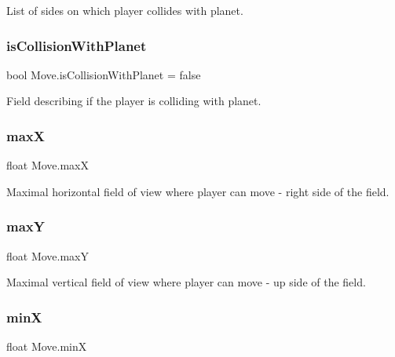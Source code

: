 List of sides on which player collides with planet. 

\mbox{\label{class_move_a2d2bbc6c6fb1799016e619d21362f4c1}} 
\subsubsection{\texorpdfstring{is\+Collision\+With\+Planet}{isCollisionWithPlanet}}
{\footnotesize\ttfamily bool Move.\+is\+Collision\+With\+Planet = false\hspace{0.3cm}{\ttfamily [private]}}



Field describing if the player is colliding with planet. 

\mbox{\label{class_move_abfc7d7aef2e83ad1b109cddd3adf08aa}} 
\subsubsection{\texorpdfstring{maxX}{maxX}}
{\footnotesize\ttfamily float Move.\+maxX\hspace{0.3cm}{\ttfamily [private]}}



Maximal horizontal field of view where player can move -\/ right side of the field. 

\mbox{\label{class_move_a60bf2e4d67e4ea7800e7d6dc9a5ab655}} 
\subsubsection{\texorpdfstring{maxY}{maxY}}
{\footnotesize\ttfamily float Move.\+maxY\hspace{0.3cm}{\ttfamily [private]}}



Maximal vertical field of view where player can move -\/ up side of the field. 

\mbox{\label{class_move_a3af9987290d9102403ef5218d5c174aa}} 
\subsubsection{\texorpdfstring{minX}{minX}}
{\footnotesize\ttfamily float Move.\+minX\hspace{0.3cm}{\ttfamily [private]}}



